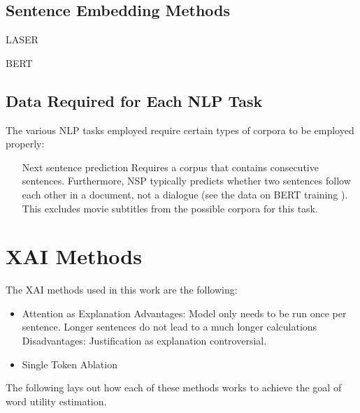 \subsection{Sentence Embedding Methods}

\begin{description}
	\item[LASER] \cite{artetxeMassivelyMultilingualSentence2019}
	\item[BERT] \cite{reimersMakingMonolingualSentence2020}
\end{description}

\subsection{Data Required for Each NLP Task}
The various NLP tasks employed require certain types of corpora to be employed properly:

\begin{itemize}
	\item[Next sentence prediction]
	      Requires a corpus that contains consecutive sentences.
	      Furthermore, NSP typically predicts whether two sentences follow each other in a document, not a dialogue (see the data on BERT training \cite{kentonBertPretrainingDeep2019}).
	      This excludes movie subtitles from the possible corpora for this task.

\end{itemize}

\section{XAI Methods} \label{sec:xai-methods}

The XAI methods used in this work are the following:
\begin{itemize}
	\item Attention as Explanation
	      Advantages:
	      Model only needs to be run once per sentence.
	      Longer sentences do not lead to a much longer calculations
	      Disadvantages: Justification as explanation controversial.
	\item Single Token Ablation
\end{itemize}

The following lays out how each of these methods works to achieve the goal of word utility estimation.

